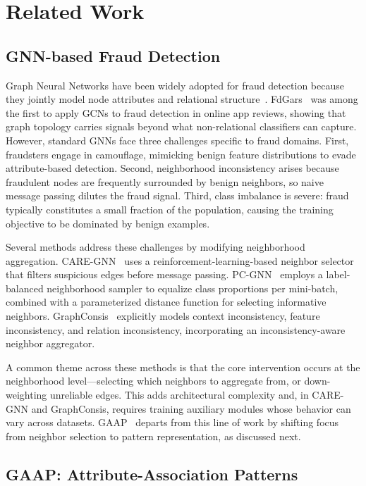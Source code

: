 \section{Related Work}
\label{sec:related_work}

\subsection{GNN-based Fraud Detection}

Graph Neural Networks have been widely adopted for fraud detection because they jointly model node attributes and relational structure~\cite{wu2020comprehensive}. FdGars~\cite{wang2019fdgars} was among the first to apply GCNs to fraud detection in online app reviews, showing that graph topology carries signals beyond what non-relational classifiers can capture. However, standard GNNs face three challenges specific to fraud domains. First, fraudsters engage in camouflage, mimicking benign feature distributions to evade attribute-based detection. Second, neighborhood inconsistency arises because fraudulent nodes are frequently surrounded by benign neighbors, so naive message passing dilutes the fraud signal. Third, class imbalance is severe: fraud typically constitutes a small fraction of the population, causing the training objective to be dominated by benign examples.

Several methods address these challenges by modifying neighborhood aggregation. CARE-GNN~\cite{dou2020enhancing} uses a reinforcement-learning-based neighbor selector that filters suspicious edges before message passing. PC-GNN~\cite{liu2021pick} employs a label-balanced neighborhood sampler to equalize class proportions per mini-batch, combined with a parameterized distance function for selecting informative neighbors. GraphConsis~\cite{liu2020alleviating} explicitly models context inconsistency, feature inconsistency, and relation inconsistency, incorporating an inconsistency-aware neighbor aggregator.

A common theme across these methods is that the core intervention occurs at the neighborhood level---selecting which neighbors to aggregate from, or down-weighting unreliable edges. This adds architectural complexity and, in CARE-GNN and GraphConsis, requires training auxiliary modules whose behavior can vary across datasets. GAAP~\cite{duan2025global} departs from this line of work by shifting focus from neighbor selection to pattern representation, as discussed next.

\subsection{GAAP: Attribute-Association Patterns}


